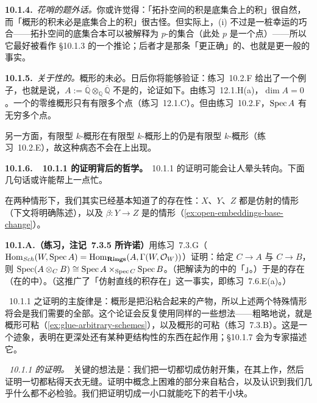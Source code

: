 \textbf{10.1.4.}\ \emph{花哨的题外话。}\quad 你或许觉得：「拓扑空间的积是底集合上的积」很自然，而「概形的积未必是底集合上的积」很古怪。但实际上，(i) 不过是一桩幸运的巧合——拓扑空间的底集合本可以被解释为 $p$-\trValuedPoint{}的集合（此处 $p$ 是一个点）——所以它最好被看作 \S10.1.3 的一个推论；后者才是那条「更正确」的、也就是更一般的事实。

\textbf{10.1.5.}\ \emph{关于\trNoetherian{}性的\trhWarning{}。}\quad \trNoetherian{}概形的\trFiberProduct{}未必\trNoetherian。日后你将能够验证：\mbox{练习~10.2.F} 给出了一个例子，也就是说，$A:=\overline{\mathbb{Q}}\otimes_{\mathbb{Q}}\overline{\mathbb{Q}}$ 不是\trNoetherian{}的，论证如下。由\mbox{练习~12.1.H}(a)，$\dim A=0$。一个\trNoetherian{}的零维概形只有有限多个点（\mbox{练习~12.1.C}）。但由\mbox{练习~10.2.F}，$\operatorname{Spec} A$ 有无穷多个点。

另一方面，有限型 $k$-概形在有限型 $k$-概形上的\trFiberProduct{}仍是有限型 $k$-概形（\mbox{练习~10.2.E}），故这种病态不会在\trVariety{}上出现。

\textbf{10.1.6.\ \trhTheorem{}~10.1.1 的证明背后的哲学。}\quad \trhTheorem{}~10.1.1 的证明可能会让人晕头转向。下面几句话或许能帮上一点忙。

在两种情形下，我们其实已经基本知道了\trFiberProduct{}的存在性：$X$、$Y$、$Z$ 都是仿射的情形（下文将明确陈述），以及 $\beta\colon Y\to Z$ 是\trOpenEmbedding{}的情形（\cref{ex:open-embeddings-base-change}）。

\textbf{10.1.A.（练习，注记~7.3.5 所许诺）}\quad 用练习~7.3.G（$\operatorname{Hom}_{\mathit{Sch}}(W,\operatorname{Spec} A)=\operatorname{Hom}_{\mathbf{Rings}}(A,\Gamma(W,\mathcal{O}_W))$）证明：给定\trRingMorphism{} $C\to A$ 与 $C\to B$，则 $\operatorname{Spec}(A\otimes_C B)\cong\operatorname{Spec} A\times_{\operatorname{Spec} C}\operatorname{Spec} B$。（把\trTensorProduct{}解读为\trRing{}的\trCategory{}中的「\trFiberedCoproduct」。）于是\trAffineScheme{}的\trFiberProduct{}存在（在\trScheme{}的\trCategory{}中）。（这推广了「仿射直线的积存在」这一事实，即\mbox{练习~7.6.E}(a)。）

\trhTheorem{}~10.1.1 之证明的主旋律是：概形是把\trAffine\trScheme{}沿\trOpenSubset{}粘合起来的产物，所以上述两个特殊情形将会是我们需要的全部。这个论证会反复使用同样的一些想法——粗略地说，就是概形可粘（\cref{ex:glue-arbitrary-schemes}），以及概形的\trMorphism{}可粘（\mbox{练习~7.3.B}）。这是一个迹象，表明在更深处还有某种更结构性的东西在起作用；\S10.1.7 会为专家描述它。

\emph{\trhTheorem{}~10.1.1 的证明。}\ 关键的想法是：我们把一切都切成仿射开集，在其上作\trFiberProduct，然后证明一切都粘得天衣无缝。证明中概念上困难的部分来自粘合，以及认识到我们几乎什么都不必检验。我们把证明切成一小口就能吃下的若干小块。

